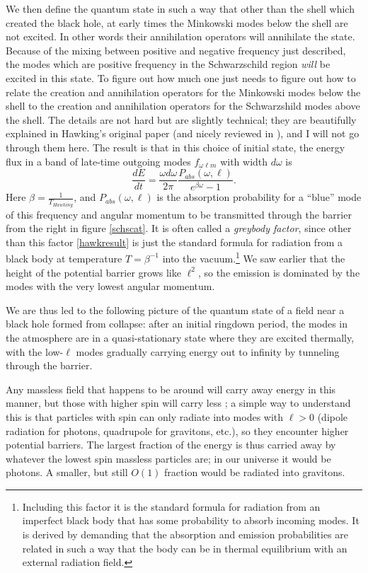 \documentclass[12pt]{article}
\newcommand{\be}{\begin{equation}}
\newcommand{\ee}{\end{equation}}
\begin{document}
We then define the quantum state in such a way that other than the shell which created the black hole, at early times the Minkowski modes below the shell are not excited.  In other words their annihilation operators will annihilate the state.  Because of the mixing between positive and negative frequency just described, the modes which are positive frequency in the Schwarzschild region \textit{will} be excited in this state.  To figure out how much one just needs to figure out how to relate the creation and annihilation operators for the Minkowski modes below the shell to the creation and annihilation operators for the Schwarzshild modes above the shell.  The details are not hard but are slightly technical; they are beautifully explained in Hawking's original paper \cite{Hawking:1974sw} (and nicely reviewed in \cite{Wald:1984rg}), and I will not go through them here.  The result is that in this choice of initial state, the energy flux in a band of late-time outgoing modes $f_{\omega \ell m}$ with width $d\omega$ is
\be\label{hawkresult}
\frac{dE}{dt}=\frac{\omega d\omega}{2\pi}\frac{P_{abs}(\omega,\ell)}{e^{\beta \omega}-1}.
\ee
Here $\beta=\frac{1}{T_{Hawking}}$, and $P_{abs}(\omega,\ell)$ is the absorption probability for a ``blue'' mode of this frequency and angular momentum to be transmitted through the barrier from the right in figure \ref{schscat}.  It is often called a \textit{greybody factor}, since other than this factor \eqref{hawkresult} is just the standard formula for radiation from a black body at temperature $T=\beta^{-1}$ into the vacuum.\footnote{Including this factor it is the standard formula for radiation from an imperfect black body that has some probability to absorb incoming modes.  It is derived by demanding that the absorption and emission probabilities are related in such a way that the body can be in thermal equilibrium with an external radiation field.}  We saw earlier that the height of the potential barrier grows like $\ell^2$, so the emission is dominated by the modes with the very lowest angular momentum.    

We are thus led to the following picture of the quantum state of a field near a black hole formed from collapse: after an initial ringdown period, the modes in the atmosphere are in a quasi-stationary state where they are excited thermally, with the low-$\ell$ modes gradually carrying energy out to infinity by tunneling through the barrier.  

Any massless field that happens to be around will carry away energy in this manner, but those with higher spin will carry less \cite{Page:1976df}; a simple way to understand this is that particles with spin can only radiate into modes with $\ell>0$ (dipole radiation for photons, quadrupole for gravitons, etc.), so they encounter higher potential barriers.  The largest fraction of the energy is thus carried away by whatever the lowest spin massless particles are; in our universe it would be photons.  A smaller, but still $O(1)$ fraction would be radiated into gravitons.    
\end{document}

